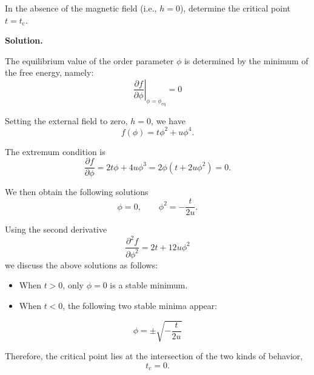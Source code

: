 \documentclass[11pt,a4paper]{article}
\newcounter{problem}
\newcounter{saveequation}
\newenvironment{solution}
{
	\par
	\setcounter{saveequation}{\value{equation}}
	\begingroup
	\setcounter{equation}{0}
	\renewcommand{\theequation}{\arabic{problem}.\arabic{equation}}
	\renewcommand{\theHequation}{sol.\arabic{problem}.\arabic{equation}}
	\noindent\textbf{Solution.}\quad
}
{
	\par
	\endgroup
	\setcounter{equation}{\value{saveequation}}
}
\begin{document}
	\begin{problembox}
		\label{prob:1}
		In the absence of the magnetic field (i.e., $h = 0$), determine the critical point $t = t_{\mathrm c}$.
	\end{problembox}
	\begin{solution}
		The equilibrium value of the order parameter $\phi$ is determined by the minimum of the free energy, namely:
		\begin{equation}
			\label{eq:1.1}
			\left.\frac{\partial f}{\partial \phi}\right|_{\phi=\phi_{\mathrm{eq}}}=0
		\end{equation}
		
		Setting the external field to zero, $h=0$, we have
		\begin{equation}
			f(\phi)=t\phi^2+u\phi^4.
		\end{equation}
		
		The extremum condition is
		\begin{equation}
			\frac{\partial f}{\partial \phi}=2t\phi+4u\phi^3=2\phi\left(t+2u\phi^2\right)=0.
		\end{equation}
		
		We then obtain the following solutions
		\begin{equation}
			\label{eq:1.4}
			\phi=0,\qquad \phi^2=-\frac{t}{2u}.
		\end{equation}
		
		Using the second derivative
		\begin{equation}
		\frac{\partial^2 f}{\partial \phi^2}=2t+12u\phi^2
		\end{equation}
		we discuss the above solutions as follows:
		
		\begin{itemize}
			\item When $t>0$, only $\phi=0$ is a stable minimum.
			\item When $t<0$, the following two stable minima appear:
		\end{itemize}
		
		\begin{equation}
			\phi=\pm\sqrt{-\frac{t}{2u}}
		\end{equation}
		\begin{finalanswer}
		Therefore, the critical point lies at the intersection of the two kinds of behavior,
			\begin{equation}
				\label{fin:1}
				t_c=0.
			\end{equation}
			\end{finalanswer}
	    \end{solution}
	
\end{document}
